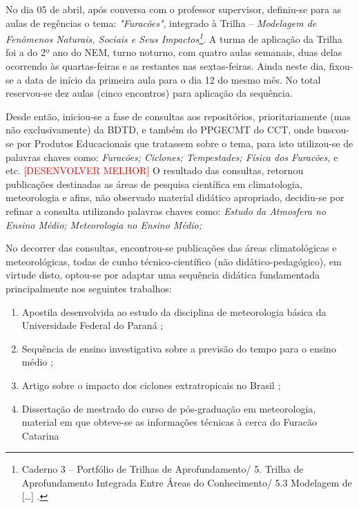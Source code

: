 
No dia 05 de abril, após conversa com o professor supervisor, definiu-se para as aulas de regências o tema: \textit{"Furacões"}, integrado à Trilha -- \textit{Modelagem de Fenômenos Naturais, Sociais e Seus Impactos\footnote{Caderno 3 -- Portfólio de Trilhas de Aprofundamento/ 5. Trilha de Aprofundamento Integrada Entre Áreas do Conhecimento/ 5.3 Modelagem de [\ldots] \cite[pp.~191-205]{CATARINA:2021c}.}}. A turma de aplicação da Trilha foi a do 2º ano do \ac{NEM}, turno noturno, com quatro aulas semanais, duas delas ocorrendo às quartas-feiras e as restantes nas sextas-feiras. Ainda neste dia, fixou-se a data de início da primeira aula para o dia 12 do mesmo mês. No total reservou-se dez aulas (cinco encontros) para aplicação da sequência.

Desde então, iniciou-se a fase de consultas aos repositórios, prioritariamente (mas não exclusivamente) da \ac{BDTD}, e também do \ac{PPGECMT} do \ac{CCT}, onde buscou-se por Produtos Educacionais que tratassem sobre o tema, para isto utilizou-se de palavras chaves como: \textit{Furacões; Ciclones; Tempestades; Física dos Furacões,} e etc.
\textcolor{red}{[DESENVOLVER MELHOR]}
O resultado das consultas, retornou publicações destinadas as áreas de pesquisa científica em climatologia, meteorologia e afins, não observado material didático apropriado, decidiu-se por refinar a consulta utilizando palavras chaves como: \textit{Estudo da Atmosfera no Ensino Médio; Meteorologia no Ensino Médio;}

No decorrer das consultas, encontrou-se publicações das áreas climatológicas e meteorológicas, todas de cunho técnico-científico (não didático-pedagógico), em virtude disto, optou-se por adaptar uma sequência didática fundamentada principalmente nos seguintes trabalhos:
\begin{enumerate}[label=\roman *)]
	\item Apostila desenvolvida ao estudo da disciplina de meteorologia básica da Universidade Federal do Paraná \cite{GRIMM:1999};
	\item Sequência de ensino investigativa sobre a previsão do tempo para o ensino médio \cite{MARIO:2017};
	\item Artigo sobre o impacto dos ciclones extratropicais no Brasil \cite{MARRAFON:2021};
	\item Dissertação de mestrado do curso de pós-graduação em meteorologia, material em que obteve-se as informações técnicas à cerca do Furacão Catarina \cite{ROCHA:2014} 
\end{enumerate}

